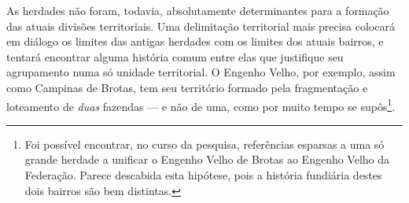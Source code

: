 As herdades não foram, todavia, absolutamente determinantes para a formação das atuais divisões territoriais. Uma delimitação territorial mais precisa colocará em diálogo os limites das antigas herdades com os limites dos atuais bairros, e tentará encontrar alguma história comum entre elas que justifique seu agrupamento numa só unidade territorial. O Engenho Velho, por exemplo, assim como Campinas de Brotas, tem seu território formado pela fragmentação e loteamento de \textit{duas} fazendas --- e não de uma, como por muito tempo se supôs\footnote{Foi possível encontrar, no curso da pesquisa, referências esparsas a uma só grande herdade a unificar o Engenho Velho de Brotas ao Engenho Velho da Federação. Parece descabida esta hipótese, pois a história fundiária destes dois bairros são bem distintas.}. 

